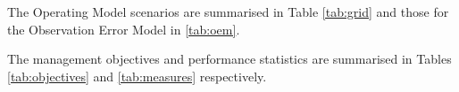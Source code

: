 \documentclass[%
nonumbib,      %
%
]{nrc1}                          %
\begin{document}
The Operating Model scenarios are summarised in Table \ref{tab:grid} and those for the Observation Error Model in \ref{tab:oem}.  


The management objectives and performance statistics are summarised in Tables \ref{tab:objectives} and \ref{tab:measures} respectively.




 
\end{document}
